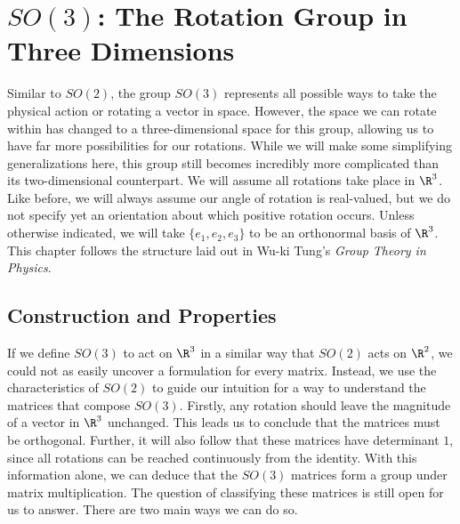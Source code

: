 \chapter{$SO(3)$: The Rotation Group in Three Dimensions}\label{so3}

Similar to $SO(2)$, the group $SO(3)$ represents all possible ways to take the physical action or rotating a vector in space. However, the space we can rotate within has changed to a three-dimensional space for this group, allowing us to have far more possibilities for our rotations. While we will make some simplifying generalizations here, this group still becomes incredibly more complicated than its two-dimensional counterpart. We will assume all rotations take place in $\R^3$. Like before, we will always assume our angle of rotation is real-valued, but we do not specify yet an orientation about which positive rotation occurs. Unless otherwise indicated, we will take $\{e_1,e_2,e_3\}$ to be an orthonormal basis of $\R^3$. This chapter follows the structure laid out in Wu-ki Tung's \textit{Group Theory in Physics}. \cite{Tung}

\section{Construction and Properties}

If we define $SO(3)$ to act on $\R^3$ in a similar way that $SO(2)$ acts on $\R^2$, we could not as easily uncover a formulation for every matrix. Instead, we use the characteristics of $SO(2)$ to guide our intuition for a way to understand the matrices that compose $SO(3)$. Firstly, any rotation should leave the magnitude of a vector in $\R^3$ unchanged. This leads us to conclude that the matrices must be orthogonal. Further, it will also follow that these matrices have determinant $1$, since all rotations can be reached continuously from the identity. With this information alone, we can deduce that the $SO(3)$ matrices form a group under matrix multiplication. The question of classifying these matrices is still open for us to answer. There are two main ways we can do so.

